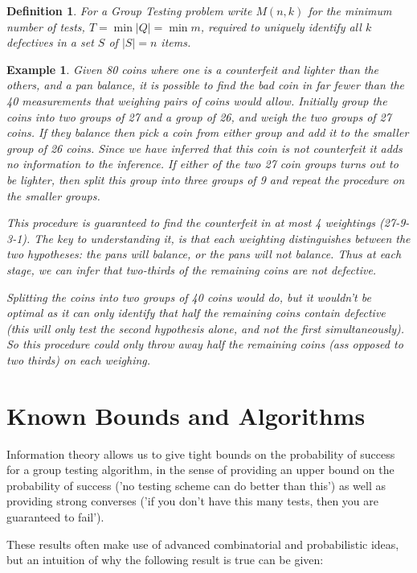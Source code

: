 \documentclass[11pt]{article}
\newtheorem{example}{Example}[section]
\newtheorem{definition}{Definition}[section]
\begin{document}
\begin{definition}
For a Group Testing problem write \( M\left(n,k\right) \) for the minimum number of tests, \(T = \min{\lvert Q \rvert}  = \min{m}\), required to uniquely identify all \(k\) defectives in a set \(S\) of \(\lvert S \rvert = n \) items.
\end{definition}

\begin{example}
Given 80 coins where one is a counterfeit and lighter than the others, and a pan balance, it is possible to find the bad coin in far fewer than the 40 measurements that weighing pairs of coins would allow. Initially group the coins into two groups of 27 and a group of 26, and weigh the two groups of 27 coins. If they balance then pick a coin from  either group and add it to the smaller group of 26 coins. Since we have inferred that this coin is not counterfeit it adds no information to the inference. If either of the two 27 coin groups turns out to be lighter, then split this group into three groups of 9 and repeat the procedure on the smaller groups. 

This procedure is guaranteed to find the counterfeit in at most 4 weightings (27-9-3-1). The key to understanding it, is that each weighting distinguishes between the two hypotheses: the pans will balance, or the pans will not balance. Thus at each stage, we can infer that two-thirds of the remaining coins are not defective. 

Splitting the coins into two groups of 40 coins would do, but it wouldn't be optimal as it can only identify that half the remaining coins contain defective (this will only test the second hypothesis alone, and not the first simultaneously). So this procedure could only throw away half the remaining coins (ass opposed to two thirds) on each weighing.
\end{example}

\section{Known Bounds and Algorithms}
Information theory allows us to give tight bounds on the probability of success for a group testing algorithm, in the sense of providing an upper bound on the probability of success ('no testing scheme can do better than this') as well as providing strong converses ('if you don't have this many tests, then you are guaranteed to fail').

These results often make use of advanced combinatorial and probabilistic ideas, but an intuition of why the following result is true can be given:
\end{document}

